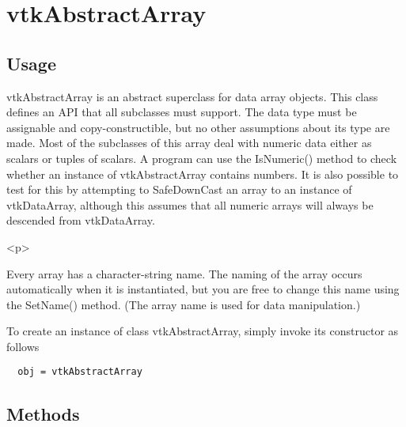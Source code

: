 \section{vtkAbstractArray}

\subsection{Usage}


 vtkAbstractArray is an abstract superclass for data array objects.
 This class defines an API that all subclasses must support.  The
 data type must be assignable and copy-constructible, but no other
 assumptions about its type are made.  Most of the subclasses of
 this array deal with numeric data either as scalars or tuples of
 scalars.  A program can use the IsNumeric() method to check whether
 an instance of vtkAbstractArray contains numbers.  It is also
 possible to test for this by attempting to SafeDownCast an array to
 an instance of vtkDataArray, although this assumes that all numeric
 arrays will always be descended from vtkDataArray.

 <p>

 Every array has a character-string name. The naming of the array
 occurs automatically when it is instantiated, but you are free to
 change this name using the SetName() method.  (The array name is
 used for data manipulation.)


To create an instance of class vtkAbstractArray, simply
invoke its constructor as follows
\begin{verbatim}
  obj = vtkAbstractArray
\end{verbatim}
\subsection{Methods}

